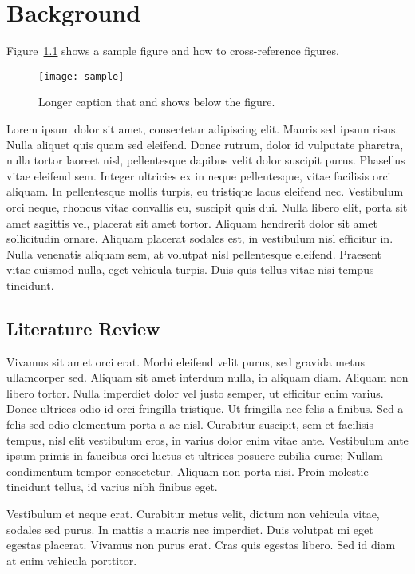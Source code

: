 \graphicspath{{content/chapters/2_background/figures/}}

\chapter{Background}%
\label{chp:background}

Figure~\ref{fig:sample} shows a sample figure and how to cross-reference
figures.
%
\begin{figure}[htbp]
    \centering
    \texttt{[image: sample]}
    \caption[Short sample caption.]{Longer caption that  and shows below the figure.\label{fig:sample}}
\end{figure}
%
Lorem ipsum dolor sit amet, consectetur adipiscing elit.
Mauris sed ipsum risus.
Nulla aliquet quis quam sed eleifend.
Donec rutrum, dolor id vulputate pharetra, nulla tortor laoreet nisl,
pellentesque dapibus velit dolor suscipit purus.
Phasellus vitae eleifend sem.
Integer ultricies ex in neque pellentesque, vitae facilisis orci aliquam.
In pellentesque mollis turpis, eu tristique lacus eleifend nec.
Vestibulum orci neque, rhoncus vitae convallis eu, suscipit quis dui.
Nulla libero elit, porta sit amet sagittis vel, placerat sit amet tortor.
Aliquam hendrerit dolor sit amet sollicitudin ornare.
Aliquam placerat sodales est, in vestibulum nisl efficitur in.
Nulla venenatis aliquam sem, at volutpat nisl pellentesque eleifend.
Praesent vitae euismod nulla, eget vehicula turpis.
Duis quis tellus vitae nisi tempus tincidunt.

\section{Literature Review}%
\label{sec:literature_review}

Vivamus sit amet orci erat.
Morbi eleifend velit purus, sed gravida metus ullamcorper sed.
Aliquam sit amet interdum nulla, in aliquam diam.
Aliquam non libero tortor.
Nulla imperdiet dolor vel justo semper, ut efficitur enim varius.
Donec ultrices odio id orci fringilla tristique.
Ut fringilla nec felis a finibus.
Sed a felis sed odio elementum porta a ac nisl.
Curabitur suscipit, sem et facilisis tempus, nisl elit vestibulum eros, in
varius dolor enim vitae ante.
Vestibulum ante ipsum primis in faucibus orci luctus et ultrices posuere cubilia
curae; Nullam condimentum tempor consectetur.
Aliquam non porta nisi.
Proin molestie tincidunt tellus, id varius nibh finibus eget.

Vestibulum et neque erat.
Curabitur metus velit, dictum non vehicula vitae, sodales sed purus.
In mattis a mauris nec imperdiet.
Duis volutpat mi eget egestas placerat.
Vivamus non purus erat.
Cras quis egestas libero.
Sed id diam at enim vehicula porttitor.

